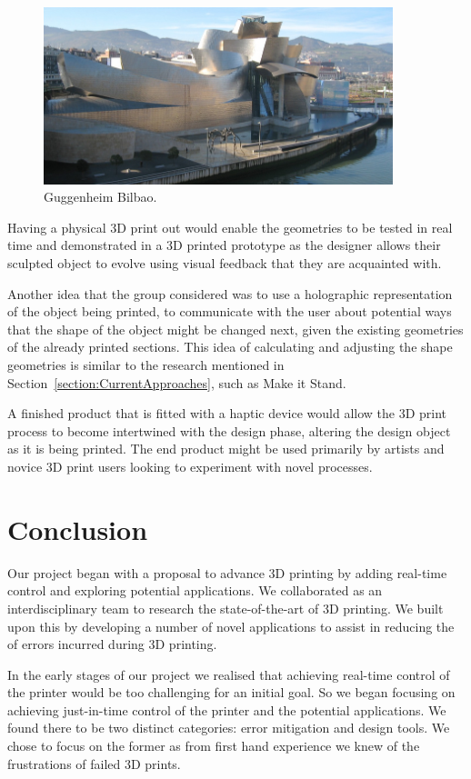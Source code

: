 \documentclass[11pt]{report} %
\begin{document}
\begin{figure}[H]
  \centering
  \includegraphics[width=4in]{GuggenheimBilbao.png}
  \caption{Guggenheim Bilbao.}
  \label{figure:GuggenheimBilbao}
\end{figure}

Having a physical 3D print out would enable the geometries to be tested in real time and demonstrated in a 3D printed prototype as the designer allows their sculpted object to evolve using visual feedback that they are acquainted with. 

	Another idea that the group considered was to use a holographic representation of the object being printed, to communicate with the user about potential ways that the shape of the object might be changed next, given the existing geometries of the already printed sections. This idea of calculating and adjusting the shape geometries is similar to the research mentioned in Section~\ref{section:CurrentApproaches}, such as Make it Stand.

	A finished product that is fitted with a haptic device would allow the 3D print process to become intertwined with the design phase, altering the design object as it is being printed. The end product might be used primarily by artists and novice 3D print users looking to experiment with novel processes.   



\chapter{Conclusion}
Our project began with a proposal to advance 3D printing by adding real-time control and exploring potential applications. We collaborated as an interdisciplinary team to research the state-of-the-art of 3D printing. We built upon this by developing a number of novel applications to assist in reducing the of errors incurred during 3D printing. 

In the early stages of our project we realised that achieving real-time control of the printer would be too challenging for an initial goal. So we began focusing on achieving just-in-time control of the printer and the potential applications. We found there to be two distinct categories: error mitigation and design tools. We chose to focus on the former as from first hand experience we knew of the frustrations of failed 3D prints.   
\end{document}
